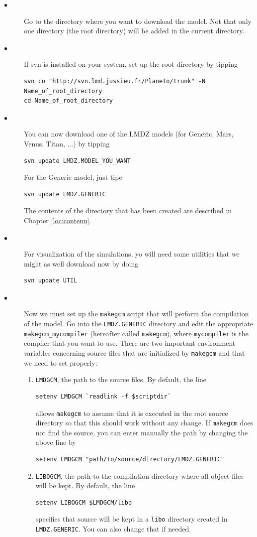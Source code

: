 \begin{description}
\item[$\bullet$] Go to the directory where you want to download the model. Not that only one directory (the root directory) will be added in the current directory.

\item[$\bullet$] If svn is installed on your system, set up the root directory by tipping 
\begin{verbatim}
svn co "http://svn.lmd.jussieu.fr/Planeto/trunk" -N Name_of_root_directory
cd Name_of_root_directory
\end{verbatim}

\item[$\bullet$] You can now download one of the LMDZ models (for Generic, Mars, Venus, Titan, ...) by tipping
\begin{verbatim}
svn update LMDZ.MODEL_YOU_WANT
\end{verbatim}
For the Generic model, just tipe
\begin{verbatim}
svn update LMDZ.GENERIC
\end{verbatim}
The contents of the directory that has been created are described in Chapter \ref{loc:contenu}.

\item[$\bullet$] For visualization of the simulations, yo will need some utilities that we might as well download now by doing
\begin{verbatim}
svn update UTIL
\end{verbatim}

\item[$\bullet$] Now we must set up the {\tt makegcm} script that will perform the compilation of the model. Go into the {\tt LMDZ.GENERIC} directory and edit the appropriate \verb"makegcm_mycompiler" (hereafter called \verb"makegcm"), where \verb"mycompiler" is the compiler that you want to use.
There are two important environment variables concerning source files that are initialized by \verb"makegcm" and that we need to set properly:
\begin{enumerate}
\item \verb"LMDGCM", the path to the source files. By default, the line
\begin{verbatim}
setenv LMDGCM `readlink -f $scriptdir`
\end{verbatim}
allows \verb"makegcm" to assume that it is executed in the root source directory so that this should work without any change. If \verb"makegcm" does not find the source, you can enter manually the path by changing the above line by
 \begin{verbatim}
setenv LMDGCM "path/to/source/directory/LMDZ.GENERIC"
\end{verbatim}
\item \verb"LIBOGCM", the path to the compilation directory where all object files will be kept. By default, the line
\begin{verbatim}
setenv LIBOGCM $LMDGCM/libo
\end{verbatim}
specifies that source will be kept in a \verb"libo" directory created in \verb"LMDZ.GENERIC". You can also change that if needed.
\end{enumerate} 


\end{description}

